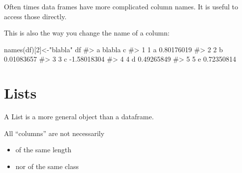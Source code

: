 \documentclass[
  letterpaper,
  DIV=11,
  numbers=noendperiod]{scrreprt}
\newenvironment{Shaded}{\begin{snugshade}}{\end{snugshade}}
\newcommand{\AttributeTok}[1]{\textcolor[rgb]{0.40,0.45,0.13}{#1}}
\newcommand{\CommentTok}[1]{\textcolor[rgb]{0.37,0.37,0.37}{#1}}
\newcommand{\DecValTok}[1]{\textcolor[rgb]{0.68,0.00,0.00}{#1}}
\newcommand{\FunctionTok}[1]{\textcolor[rgb]{0.28,0.35,0.67}{#1}}
\newcommand{\NormalTok}[1]{\textcolor[rgb]{0.00,0.23,0.31}{#1}}
\newcommand{\OtherTok}[1]{\textcolor[rgb]{0.00,0.23,0.31}{#1}}
\newcommand{\SpecialCharTok}[1]{\textcolor[rgb]{0.37,0.37,0.37}{#1}}
\newcommand{\StringTok}[1]{\textcolor[rgb]{0.13,0.47,0.30}{#1}}
\providecommand{\tightlist}{%
  \setlength{\itemsep}{0pt}\setlength{\parskip}{0pt}}\usepackage{longtable,booktabs,array}
\begin{document}
Often times data frames have more complicated column names. It is useful
to access those directly.

This is also the way you change the name of a column:

\begin{Shaded}
\begin{Highlighting}[]
\FunctionTok{names}\NormalTok{(df)[}\DecValTok{2}\NormalTok{]}\OtherTok{\textless{}{-}}\StringTok{"blabla"}
\NormalTok{df}
\CommentTok{\#\textgreater{}   a blabla           c}
\CommentTok{\#\textgreater{} 1 1      a  0.80176019}
\CommentTok{\#\textgreater{} 2 2      b  0.01083657}
\CommentTok{\#\textgreater{} 3 3      c {-}1.58018304}
\CommentTok{\#\textgreater{} 4 4      d  0.49265849}
\CommentTok{\#\textgreater{} 5 5      e  0.72350814}
\end{Highlighting}
\end{Shaded}

\section{Lists}\label{lists}

A List is a more general object than a dataframe.

All ``columns'' are not necessarily

\begin{itemize}
\tightlist
\item
  of the same length
\item
  nor of the same class
\end{itemize}

\begin{Shaded}
\end{Shaded}
\end{document}
